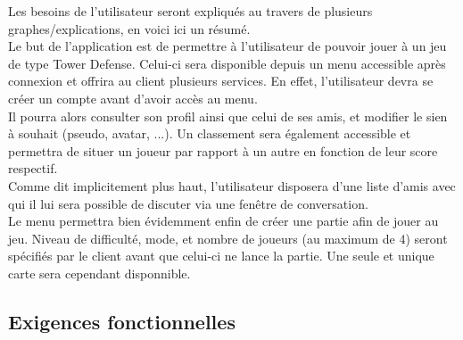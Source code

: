\documentclass[10pt,a4paper]{article}
\begin{document}
Les besoins de l'\gls{utilisateur} seront expliqués au travers de plusieurs graphes/explications, en voici ici un résumé.\\
Le but de l'application est de permettre à l'\gls{utilisateur} de pouvoir jouer à un jeu de type Tower Defense. Celui-ci sera disponible depuis un menu accessible après connexion et offrira au \gls{client} plusieurs services. En effet, l'\gls{utilisateur} devra se créer un \gls{compte} avant d'avoir accès au menu.\\
Il pourra alors consulter son profil ainsi que celui de ses amis, et modifier le sien à souhait (pseudo, avatar, ...).
Un classement sera également accessible et permettra de situer un \gls{joueur} par rapport à un autre en fonction de leur score respectif.\\
Comme dit implicitement plus haut, l'\gls{utilisateur} disposera d'une liste d'amis avec qui il lui sera possible de discuter via une fenêtre de conversation.\\

Le menu permettra bien évidemment enfin de créer une partie afin de jouer au jeu. Niveau de difficulté, mode, et nombre de \glspl{joueur} (au maximum de 4) seront spécifiés par le \gls{client} avant que celui-ci ne lance la partie. Une seule et unique carte sera cependant disponnible.\\
\subsection{Exigences fonctionnelles}
\end{document}
